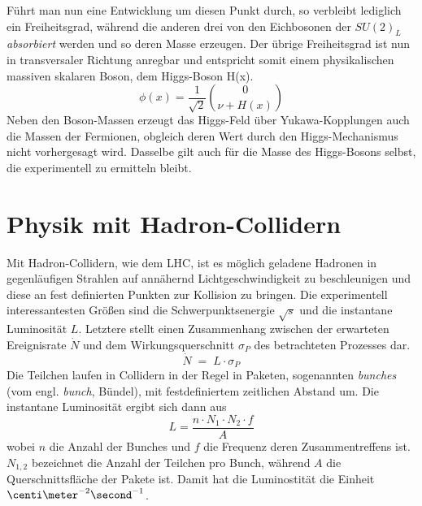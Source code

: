 Führt man nun eine Entwicklung um diesen Punkt durch, so verbleibt lediglich
ein Freiheitsgrad, während die anderen drei von den Eichbosonen der $SU(2)_L$
\textit{absorbiert} werden und so deren Masse erzeugen. Der übrige
Freiheitsgrad ist nun in transversaler Richtung anregbar und entspricht somit
einem physikalischen massiven skalaren Boson, dem Higgs-Boson H(x).
\begin{equation}
    \phi(x) = \frac{1}{\sqrt{2}}\binom{0}{\nu+H(x)}
\end{equation}
Neben den Boson-Massen erzeugt das Higgs-Feld über Yukawa-Kopplungen auch die
Massen der Fermionen, obgleich deren Wert durch den Higgs-Mechanismus nicht
vorhergesagt wird. Dasselbe gilt auch für die Masse des Higgs-Bosons selbst,
die experimentell zu ermitteln bleibt.



\section{Physik mit Hadron-Collidern}
\label{theory:hadron_collider}


Mit Hadron-Collidern, wie dem \ac{LHC}, ist es möglich geladene Hadronen in
gegenläufigen Strahlen auf annähernd Lichtgeschwindigkeit zu beschleunigen und
diese an fest definierten Punkten zur Kollision zu bringen. Die experimentell
interessantesten Größen sind die Schwerpunktsenergie $\sqrt{s}$ und die
instantane Luminosität $L$. Letztere stellt einen Zusammenhang zwischen der
erwarteten Ereignisrate $\dot N$ und dem Wirkungsquerschnitt $\sigma_P$ des
betrachteten Prozesses dar.
\begin{equation}
    \dot N \;=\; L \cdot \sigma_P
\end{equation}
Die Teilchen laufen in Collidern in der Regel in Paketen, sogenannten
\textit{bunches} (vom engl. \textit{bunch}, Bündel), mit festdefiniertem
zeitlichen Abstand um. Die instantane Luminosität ergibt sich dann aus
\begin{equation}
    L = \frac{n \cdot N_1 \cdot  N_2 \cdot f}{A}
\end{equation}
wobei $n$ die Anzahl der Bunches und $f$ die Frequenz deren Zusammentreffens
ist. $N_{1,2}$ bezeichnet die Anzahl der Teilchen pro Bunch, während $A$ die
Querschnittsfläche der Pakete ist. Damit hat die Luminostität die Einheit
$\centi\meter^{-2}\second^{-1}$.

